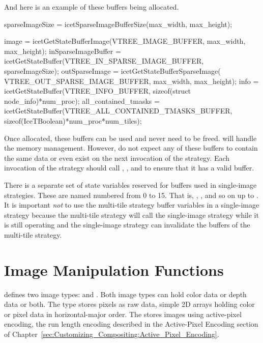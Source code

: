 And here is an example of these buffers being allocated.

\begin{code}
sparseImageSize = icetSparseImageBufferSize(max_width, max_height);

image                = icetGetStateBufferImage(VTREE_IMAGE_BUFFER,
                                               max_width, max_height);
inSparseImageBuffer  = icetGetStateBuffer(VTREE_IN_SPARSE_IMAGE_BUFFER,
                                          sparseImageSize);
outSparseImage       = icetGetStateBufferSparseImage(
                                              VTREE_OUT_SPARSE_IMAGE_BUFFER,
                                              max_width, max_height);
info                 = icetGetStateBuffer(VTREE_INFO_BUFFER,
                                         sizeof(struct node_info)*num_proc);
all_contained_tmasks = icetGetStateBuffer(VTREE_ALL_CONTAINED_TMASKS_BUFFER,
                                    sizeof(IceTBoolean)*num_proc*num_tiles);
\end{code}

Once allocated, these buffers can be used and never need to be freed.
\IceT will handle the memory management.  However, do not expect any of
these buffers to contain the same data or even exist on the next invocation
of the strategy.  Each invocation of the strategy should call
, , and
 to ensure that it has a valid buffer.

There is a separate set of state variables reserved for buffers used in
single-image strategies.  These are named
 numbered from 0 to 15.
That is, ,
, and so on up to
.  It is important \emph{not} to use
the multi-tile strategy buffer variables in a single-image strategy because
the multi-tile strategy will call the single-image strategy while it is
still operating and the single-image strategy can invalidate the buffers of
the multi-tile strategy.

\section{Image Manipulation Functions}

\IceT defines two image types:  and
.  Both image types can hold color data or depth
data or both.  The  type stores pixels as raw data, simple
2D arrays holding color or pixel data in horizontal-major order.  The
 stores images using
active-pixel encoding, the run length encoding
described in the Active-Pixel Encoding section of
Chapter~\ref{sec:Customizing_Compositing:Active_Pixel_Encoding}.

